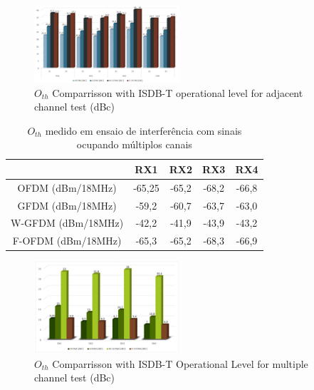 \begin{figure}[h]
    \centering
    \includegraphics[width=0.48\textwidth]{Figures/result_01.jpg}
    \caption{$O_{th}$ Comparrisson with ISDB-T operational level for adjacent channel test (dBc)}
    \label{fig:result_01}
\end{figure}


\begin{table}[h!]
	\begin{center}
		\centering
		\caption{$O_{th}$ medido em ensaio de interferência com sinais ocupando múltiplos canais}
		\label{tab:Resultados_ADJ02}
		\begin{tabular}{|c|c|c|c|c|}
			\hline
		    \textbf{}&\textbf{RX1} & \textbf{RX2} & \textbf{RX3} & \textbf{RX4}\\
			\hline
			OFDM (dBm/18MHz) &-65,25&-65,2&-68,2&-66,8\\
			\hline
			GFDM (dBm/18MHz) &-59,2&-60,7&-63,7&-63,0\\ 
			\hline
			W-GFDM (dBm/18MHz) &-42,2&-41,9&-43,9&-43,2\\
			\hline
			F-OFDM (dBm/18MHz) &-65,3 &-65,2&-68,3&-66,9\\
			\hline
		\end{tabular}
	\end{center}
\end{table}


\begin{figure}[h]
    \centering
    \includegraphics[width=0.48\textwidth]{Figures/result_02.jpg}
    \caption{$O_{th}$ Comparrisson with ISDB-T Operational Level for multiple channel test (dBc)}
    \label{fig:result_02}
\end{figure}

